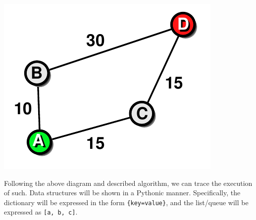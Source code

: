 \documentclass[letterpaper, 12pt]{article}
\begin{document}
\begin{multicols}{2}
\includegraphics[width=\columnwidth]{img/dijksra.pdf}

\newcommand{\pydict}[1]{\texttt{\{#1\}}}
\newcommand{\pylist}[1]{\texttt{[#1]}}
\newcommand{\pyinf}{\(\mathtt{\infty}\)}

Following the above diagram and described algorithm, we can trace the execution
of such. Data structures will be shown in a Pythonic manner. Specifically, the
dictionary will be expressed in the form \pydict{key=value}, and the list/queue
will be expressed as \pylist{a, b, c}.


\end{multicols}
\end{document}
